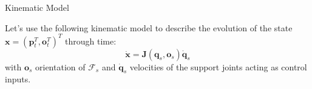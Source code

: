 \documentclass[10pt]{beamer}
\begin{document}
    \begin{frame}{Kinematic Model}
        \justifying

        Let's use the following kinematic model to describe the
        evolution of the state $\bm{x} = (\bm{p}_t^T, \bm{o}_t^T)^T$ through time:
        \begin{equation*}
            \bm{\dot{x}} = \bm{J}(\bm{q}_s, \bm{o}_s) \bm{\dot{q}}_s
        \end{equation*}
        with $\bm{o}_s$ orientation of $\mathcal{F}_s$ and
        $\bm{\dot{q}}_s$ velocities of the support joints
        acting as control inputs.

\end{frame}
\end{document}
